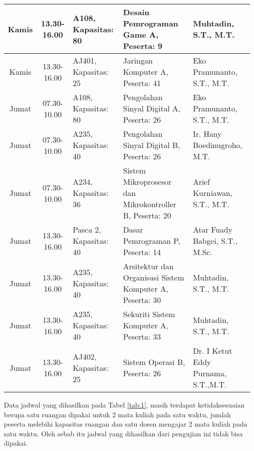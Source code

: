 \begin{longtable}[c]{|c|c|>{\centering\arraybackslash}m{2.5cm}|>{\centering\arraybackslash}m{4cm}|>{\centering\arraybackslash}m{3.2cm}|}
    Kamis  & 13.30-16.00 & A108, Kapasitas: 80    & Desain Pemrograman Game A, \linebreak Peserta: 9                    & Muhtadin, S.T., M.T.                          \\ \hline
    Kamis  & 13.30-16.00 & AJ401, Kapasitas: 25   & Jaringan Komputer A, \linebreak Peserta: 41                         & Eko Pramunanto, S.T., M.T.                    \\ \hline
    Jumat  & 07.30-10.00 & A108, Kapasitas: 80    & Pengolahan Sinyal Digital A, \linebreak Peserta: 26                 & Eko Pramunanto, S.T., M.T.                    \\ \hline
    Jumat  & 07.30-10.00 & A235, Kapasitas: 40    & Pengolahan Sinyal Digital B, \linebreak Peserta: 26                 & Ir. Hany Boedinugroho, M.T.                   \\ \hline
    Jumat  & 07.30-10.00 & A234, Kapasitas: 36    & Sistem Mikroprosesor dan Mikrokontroller B, \linebreak Peserta: 20  & Arief Kurniawan, S.T., M.T.                   \\ \hline
    Jumat  & 13.30-16.00 & Pasca 2, Kapasitas: 40 & Dasar Pemrograman P, \linebreak Peserta: 14                         & Atar Fuady Babgei, S.T., M.Sc.                \\ \hline
    Jumat  & 13.30-16.00 & A235, Kapasitas: 40    & Arsitektur dan Organisasi Sistem Komputer A, \linebreak Peserta: 30 & Muhtadin, S.T., M.T.                          \\ \hline
    Jumat  & 13.30-16.00 & A235, Kapasitas: 40    & Sekuriti Sistem Komputer A, \linebreak Peserta: 33                  & Muhtadin, S.T., M.T.                          \\ \hline
    Jumat  & 13.30-16.00 & AJ402, Kapasitas: 25   & Sistem Operasi B, \linebreak Peserta: 26                            & Dr. I Ketut Eddy Purnama, S.T.,M.T.           \\ \hline
    \end{longtable}
  Data jadwal yang dihasilkan pada Tabel \ref{tab:1}, masih terdapat ketidaksesuaian berupa satu ruangan dipakai untuk 2 mata kuliah pada satu waktu, jumlah peserta melebihi kapasitas ruangan dan satu dosen mengajar 2 mata kuliah pada satu waktu.
  Oleh sebab itu jadwal yang dihasilkan dari pengujian ini tidak bisa dipakai.
  
